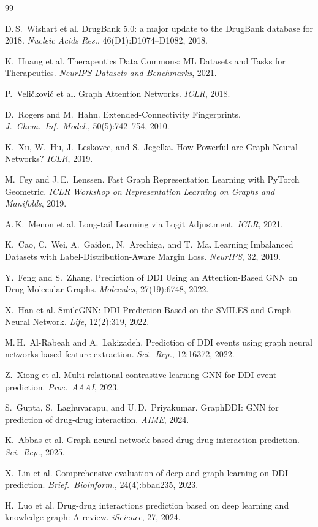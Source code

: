 \documentclass[11pt,a4paper]{report}
\begin{document}
\begin{thebibliography}{99}

D.\,S.\ Wishart et al.
DrugBank 5.0: a major update to the DrugBank database for 2018.
\emph{Nucleic Acids Res.}, 46(D1):D1074--D1082, 2018.

K.\ Huang et al.
Therapeutics Data Commons: ML Datasets and Tasks for Therapeutics.
\emph{NeurIPS Datasets and Benchmarks}, 2021.

P.\ Veli\v{c}kovi\'{c} et al.
Graph Attention Networks.
\emph{ICLR}, 2018.

D.\ Rogers and M.\ Hahn.
Extended-Connectivity Fingerprints.
\emph{J.\ Chem.\ Inf.\ Model.}, 50(5):742--754, 2010.

K.\ Xu, W.\ Hu, J.\ Leskovec, and S.\ Jegelka.
How Powerful are Graph Neural Networks?
\emph{ICLR}, 2019.

M.\ Fey and J.\,E.\ Lenssen.
Fast Graph Representation Learning with PyTorch Geometric.
\emph{ICLR Workshop on Representation Learning on Graphs and Manifolds}, 2019.

A.\,K.\ Menon et al.
Long-tail Learning via Logit Adjustment.
\emph{ICLR}, 2021.

K.\ Cao, C.\ Wei, A.\ Gaidon, N.\ Arechiga, and T.\ Ma.
Learning Imbalanced Datasets with Label-Distribution-Aware Margin Loss.
\emph{NeurIPS}, 32, 2019.

Y.\ Feng and S.\ Zhang.
Prediction of DDI Using an Attention-Based GNN on Drug Molecular Graphs.
\emph{Molecules}, 27(19):6748, 2022.

X.\ Han et al.
SmileGNN: DDI Prediction Based on the SMILES and Graph Neural Network.
\emph{Life}, 12(2):319, 2022.

M.\,H.\ Al-Rabeah and A.\ Lakizadeh.
Prediction of DDI events using graph neural networks based feature extraction.
\emph{Sci.\ Rep.}, 12:16372, 2022.

Z.\ Xiong et al.
Multi-relational contrastive learning GNN for DDI event prediction.
\emph{Proc.\ AAAI}, 2023.

S.\ Gupta, S.\ Laghuvarapu, and U.\,D.\ Priyakumar.
GraphDDI: GNN for prediction of drug-drug interaction.
\emph{AIME}, 2024.

K.\ Abbas et al.
Graph neural network-based drug-drug interaction prediction.
\emph{Sci.\ Rep.}, 2025.

X.\ Lin et al.
Comprehensive evaluation of deep and graph learning on DDI prediction.
\emph{Brief.\ Bioinform.}, 24(4):bbad235, 2023.

H.\ Luo et al.
Drug-drug interactions prediction based on deep learning and knowledge graph: A review.
\emph{iScience}, 27, 2024.

\end{thebibliography}
\end{document}
